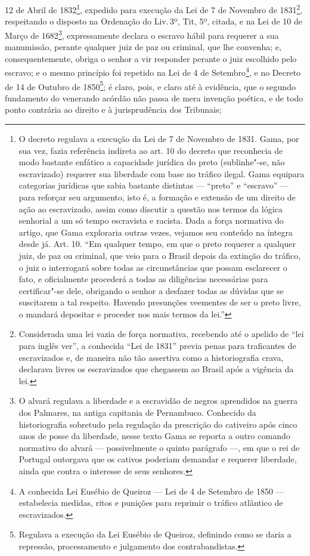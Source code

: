 12 de Abril de 1832\footnote{O decreto regulava a execução da Lei de 7
  de Novembro de 1831. Gama, por sua vez, fazia referência indireta ao
  art. 10 do decreto que reconhecia de modo bastante enfático a
  capacidade jurídica do preto (sublinhe"-se, não escravizado) requerer
  sua liberdade com base no tráfico ilegal. Gama equipara categorias
  jurídicas que sabia bastante distintas --- ``preto'' e ``escravo'' --- para
  reforçar seu argumento, isto é, a formação e extensão de um direito de
  ação ao escravizado, assim como discutir a questão nos termos da
  lógica senhorial a um só tempo escravista e racista. Dada a força
  normativa do artigo, que Gama exploraria outras vezes, vejamos seu conteúdo na
  íntegra desde já. Art. 10. ``Em qualquer tempo, em que o preto requerer
  a qualquer juiz, de paz ou criminal, que veio para o Brasil depois da
  extinção do tráfico, o juiz o interrogará sobre todas as
  circunstâncias que possam esclarecer o fato, e oficialmente procederá
  a todas as diligências necessárias para certificar"-se dele, obrigando
  o senhor a desfazer todas as dúvidas que se suscitarem a tal respeito.
  Havendo presunções veementes de ser o preto livre, o mandará depositar
  e proceder nos mais termos da lei.''}, expedido para execução da Lei de
7 de Novembro de 1831\footnote{Considerada uma lei vazia de força
  normativa, recebendo até o apelido de ``lei para inglês ver'', a
  conhecida ``Lei de 1831'' previa penas para traficantes de escravizados
  e, de maneira não tão assertiva como a historiografia crava, declarava
  livres os escravizados que chegassem ao Brasil após a vigência da lei.},
respeitando o disposto na Ordenação do Liv.\,3º, Tit, 5º, citada, e na
Lei de 10 de Março de 1682\footnote{O alvará regulava a liberdade e a
  escravidão de negros aprendidos na guerra dos Palmares, na antiga
  capitania de Pernambuco. Conhecido da historiografia sobretudo pela
  regulação da prescrição do cativeiro após cinco anos de posse da
  liberdade, nesse texto Gama se reporta a outro comando normativo do
  alvará --- possivelmente o quinto parágrafo ---, em que o rei de Portugal
  outorgava que os cativos poderiam demandar e requerer liberdade, ainda
  que contra o interesse de seus senhores.}, expressamente declara o escravo
hábil para requerer a sua manumissão, perante qualquer juiz de paz ou
criminal, que lhe convenha; e, consequentemente, obriga o senhor a vir
responder perante o juiz escolhido pelo escravo; e o mesmo princípio foi
repetido na Lei de 4 de Setembro\footnote{A conhecida Lei Eusébio de
  Queiroz --- Lei de 4 de Setembro de 1850 --- estabelecia medidas, ritos e
  punições para reprimir o tráfico atlântico de escravizados.}, e no
Decreto de 14 de Outubro de 1850\footnote{Regulava a execução da Lei
  Eusébio de Queiroz, definindo como se daria a repressão, processamento
  e julgamento dos contrabandistas.}; é claro, pois, e claro até à
evidência, que o segundo fundamento do venerando acórdão não passa de
mera invenção poética, e de todo ponto contrária ao direito e à
jurisprudência dos Tribunais;

